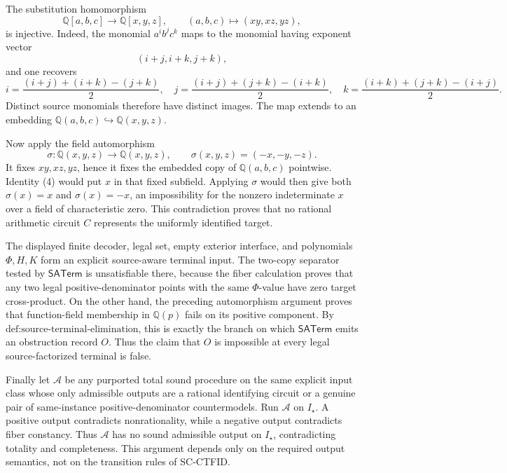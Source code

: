 The substitution homomorphism
\[
 \mathbb Q[a,b,c]\longrightarrow\mathbb Q[x,y,z],
 \qquad (a,b,c)\longmapsto(xy,xz,yz),
\]
is injective.  Indeed, the monomial \(a^i b^j c^k\) maps to the monomial having exponent vector
\[
 (i+j,i+k,j+k),
\]
and one recovers
\[
 i=\frac{(i+j)+(i+k)-(j+k)}2,
 \quad
 j=\frac{(i+j)+(j+k)-(i+k)}2,
 \quad
 k=\frac{(i+k)+(j+k)-(i+j)}2.
\]
Distinct source monomials therefore have distinct images.  The map extends to an embedding \(\mathbb Q(a,b,c)\hookrightarrow\mathbb Q(x,y,z)\).

Now apply the field automorphism
\[
 \sigma:\mathbb Q(x,y,z)\longrightarrow\mathbb Q(x,y,z),
 \qquad \sigma(x,y,z)=(-x,-y,-z).
\]
It fixes \(xy,xz,yz\), hence it fixes the embedded copy of \(\mathbb Q(a,b,c)\) pointwise.  Identity (4) would put \(x\) in that fixed subfield.  Applying \(\sigma\) would then give both \(\sigma(x)=x\) and \(\sigma(x)=-x\), an impossibility for the nonzero indeterminate \(x\) over a field of characteristic zero.  This contradiction proves that no rational arithmetic circuit \(C\) represents the uniformly identified target.

The displayed finite decoder, legal set, empty exterior interface, and polynomials \(\Phi,H,K\) form an explicit source-aware terminal input.  The two-copy separator tested by \(\mathsf{SATerm}\) is unsatisfiable there, because the fiber calculation proves that any two legal positive-denominator points with the same \(\Phi\)-value have zero target cross-product.  On the other hand, the preceding automorphism argument proves that function-field membership in \(\mathbb Q(p)\) fails on its positive component.  By \(\text{def:source-terminal-elimination}\), this is exactly the branch on which \(\mathsf{SATerm}\) emits an obstruction record \(O\).  Thus the claim that \(O\) is impossible at every legal source-factorized terminal is false.

Finally let \(\mathcal A\) be any purported total sound procedure on the same explicit input class whose only admissible outputs are a rational identifying circuit or a genuine pair of same-instance positive-denominator countermodels.  Run \(\mathcal A\) on \(I_\star\).  A positive output contradicts nonrationality, while a negative output contradicts fiber constancy.  Thus \(\mathcal A\) has no sound admissible output on \(I_\star\), contradicting totality and completeness.  This argument depends only on the required output semantics, not on the transition rules of SC-CTFID.

